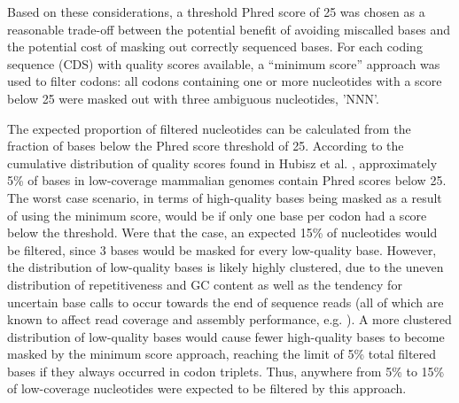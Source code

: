 Based on these considerations, a threshold Phred score of 25 was
chosen as a reasonable trade-off between the potential benefit of
avoiding miscalled bases and the potential cost of masking out
correctly sequenced bases. For each coding sequence (CDS) with quality
scores available, a ``minimum score'' approach was used to filter
codons: all codons containing one or more nucleotides with a score
below 25 were masked out with three ambiguous nucleotides,
'NNN'.

The expected proportion of filtered nucleotides can be calculated from
the fraction of bases below the Phred score threshold of 25. According
to the cumulative distribution of quality scores found in Hubisz et
al. \citeyearpar{TODO}, approximately 5\% of bases in low-coverage
mammalian genomes contain Phred scores below 25. The worst case
scenario, in terms of high-quality bases being masked as a result of
using the minimum score, would be if only one base per codon had a
score below the threshold. Were that the case, an expected 15\% of
nucleotides would be filtered, since 3 bases would be masked for every
low-quality base. However, the distribution of low-quality bases is
likely highly clustered, due to the uneven distribution of
repetitiveness and GC content as well as the tendency for uncertain
base calls to occur towards the end of sequence reads (all of which
are known to affect read coverage and assembly performance,
e.g. \cite{TODO, Teytelman et al. 2011}). A more clustered
distribution of low-quality bases would cause fewer high-quality bases
to become masked by the minimum score approach, reaching the limit of
5\% total filtered bases if they always occurred in codon
triplets. Thus, anywhere from 5\% to 15\% of low-coverage nucleotides
were expected to be filtered by this approach.









